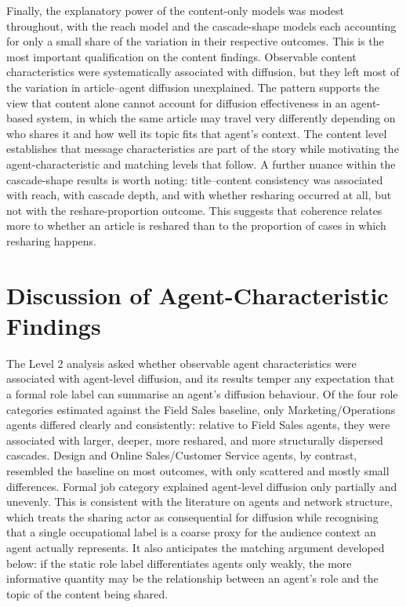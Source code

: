 Finally, the explanatory power of the content-only models was modest throughout, with the reach model and the cascade-shape models each accounting for only a small share of the variation in their respective outcomes. This is the most important qualification on the content findings. Observable content characteristics were systematically associated with diffusion, but they left most of the variation in article–agent diffusion unexplained. The pattern supports the view that content alone cannot account for diffusion effectiveness in an agent-based system, in which the same article may travel very differently depending on who shares it and how well its topic fits that agent's context. The content level establishes that message characteristics are part of the story while motivating the agent-characteristic and matching levels that follow. A further nuance within the cascade-shape results is worth noting: title–content consistency was associated with reach, with cascade depth, and with whether resharing occurred at all, but not with the reshare-proportion outcome. This suggests that coherence relates more to whether an article is reshared than to the proportion of cases in which resharing happens.

\section{Discussion of Agent-Characteristic Findings}
\label{sec:7-2-discussion-of-agent-characteristic-findings}

The Level 2 analysis asked whether observable agent characteristics were associated with agent-level diffusion, and its results temper any expectation that a formal role label can summarise an agent's diffusion behaviour. Of the four role categories estimated against the Field Sales baseline, only Marketing/Operations agents differed clearly and consistently: relative to Field Sales agents, they were associated with larger, deeper, more reshared, and more structurally dispersed cascades. Design and Online Sales/Customer Service agents, by contrast, resembled the baseline on most outcomes, with only scattered and mostly small differences. Formal job category explained agent-level diffusion only partially and unevenly. This is consistent with the literature on agents and network structure, which treats the sharing actor as consequential for diffusion while recognising that a single occupational label is a coarse proxy for the audience context an agent actually represents. It also anticipates the matching argument developed below: if the static role label differentiates agents only weakly, the more informative quantity may be the relationship between an agent's role and the topic of the content being shared.

